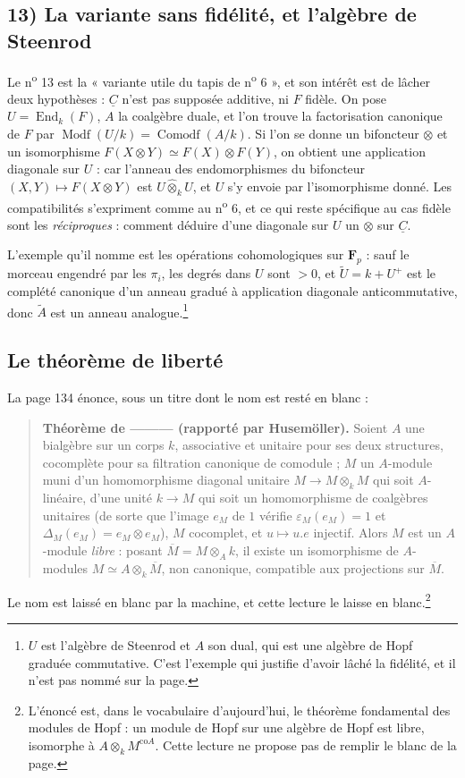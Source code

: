 \documentclass[11pt,a4paper]{article}
\begin{document}
\subsection*{13) La variante sans fidélité, et l'algèbre de Steenrod}

Le n\textsuperscript{o} 13 est la « variante utile du tapis de
n\textsuperscript{o} 6 », et son intérêt est de lâcher deux hypothèses :
$\underline{C}$ n'est pas supposée additive, ni $F$ fidèle. On pose
$U = \operatorname{End}_{k}(F)$, $A$ la coalgèbre duale, et l'on trouve la
factorisation canonique de $F$ par
$\operatorname{Modf}(U/k) = \operatorname{Comodf}(A/k)$. Si l'on se donne un
bifoncteur $\otimes$ et un isomorphisme $F(X \otimes Y) \simeq F(X) \otimes
F(Y)$, on obtient une application diagonale sur $U$ : car l'anneau des
endomorphismes du bifoncteur $(X,Y) \mapsto F(X \otimes Y)$ est
$U \mathbin{\widehat{\otimes}}_{k} U$, et $U$ s'y envoie par l'isomorphisme
donné. Les compatibilités s'expriment comme au n\textsuperscript{o} 6, et ce
qui reste spécifique au cas fidèle sont les \emph{réciproques} : comment
déduire d'une diagonale sur $U$ un $\otimes$ sur $\underline{C}$.

L'exemple qu'il nomme est les opérations cohomologiques sur $\mathbf{F}_{p}$ :
sauf le morceau engendré par les $\pi_{i}$, les degrés dans $U$ sont $> 0$, et
$\widetilde{U} = k + U^{+}$ est le complété canonique d'un anneau gradué à
application diagonale anticommutative, donc $\widetilde{A}$ est un anneau
analogue.\footnote{$U$ est l'algèbre de Steenrod et $A$ son dual, qui est
une algèbre de Hopf graduée commutative. C'est l'exemple qui
justifie d'avoir lâché la fidélité, et il n'est pas nommé sur la page.}

\subsection*{Le théorème de liberté}

La page 134 énonce, sous un titre dont le nom est resté en blanc :
\begin{quote}
\textbf{Théorème de ——— (rapporté par Husemöller).} Soient $A$ une bialgèbre
sur un corps $k$, associative et unitaire pour ses deux structures, cocomplète
pour sa filtration canonique de comodule ; $M$ un $A$-module muni d'un
homomorphisme diagonal unitaire $M \to M \otimes_{k} M$ qui soit $A$-linéaire,
d'une unité $k \to M$ qui soit un homomorphisme de coalgèbres unitaires (de
sorte que l'image $e_{M}$ de $1$ vérifie $\varepsilon_{M}(e_{M}) = 1$ et
$\Delta_{M}(e_{M}) = e_{M} \otimes e_{M}$), $M$ cocomplet, et $u \mapsto
u.e$ injectif. Alors $M$ est un $A$-module \emph{libre} : posant
$\overline{M} = M \otimes_{A} k$, il existe un isomorphisme de $A$-modules
$M \simeq A \otimes_{k} \overline{M}$, non canonique, compatible aux projections
sur $\overline{M}$.
\end{quote}
Le nom est laissé en blanc par la machine, et cette lecture le laisse en
blanc.\footnote{L'énoncé est, dans le vocabulaire d'aujourd'hui, le théorème
fondamental des modules de Hopf : un module de Hopf sur une algèbre de Hopf est
libre, isomorphe à $A \otimes_{k} M^{\mathrm{co}A}$. Cette lecture ne
propose pas de remplir le blanc de la page.}
\end{document}
